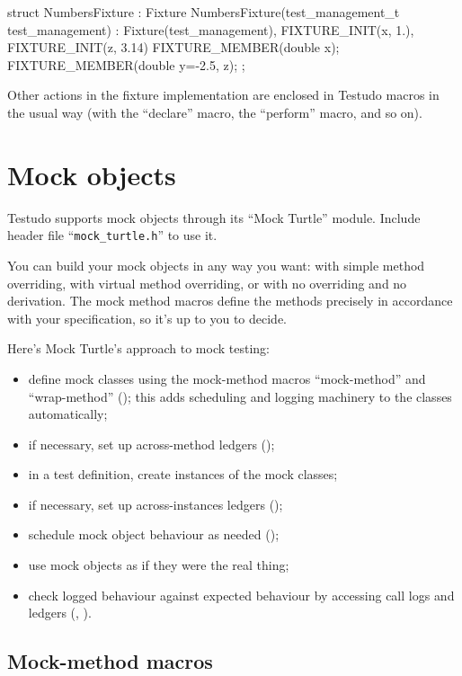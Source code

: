 \documentclass[twoside, a4paper, article]{memoir}
\begin{document}
\begin{cpplisting}
struct NumbersFixture : Fixture
{
  NumbersFixture(test_management_t test_management)
    : Fixture(test_management),
      FIXTURE_INIT(x, 1.),
      FIXTURE_INIT(z, 3.14) { }
  FIXTURE_MEMBER(double x);
  FIXTURE_MEMBER(double y=-2.5, z);
};
\end{cpplisting}

Other actions in the fixture implementation are enclosed in Testudo macros in
the usual way (with the ``declare'' macro, the ``perform'' macro, and so on).


\chapter{Mock objects}
\label{cha:mock-objects}

Testudo supports mock objects through its ``Mock Turtle'' module.  Include
header file ``\texttt{mock\_turtle.h}'' to use it.

You can build your mock objects in any way you want: with simple method
overriding, with virtual method overriding, or with no overriding and no
derivation.  The mock method macros define the methods precisely in accordance
with your specification, so it's up to you to decide.

Here's Mock Turtle's approach to mock testing:
\begin{itemize}
\item define mock classes using the mock-method macros ``mock-method'' and
  ``wrap-method'' (); this adds scheduling and
  logging machinery to the classes automatically;
\item if necessary, set up across-method ledgers
  ();
\item in a test definition, create instances of the mock classes;
\item if necessary, set up across-instances ledgers
  ();
\item schedule mock object behaviour as needed
  ();
\item use mock objects as if they were the real thing;
\item check logged behaviour against expected behaviour by accessing call logs
  and ledgers (, ).
\end{itemize}

\section{Mock-method macros}
\label{sec:mock-method-macros}
\end{document}
